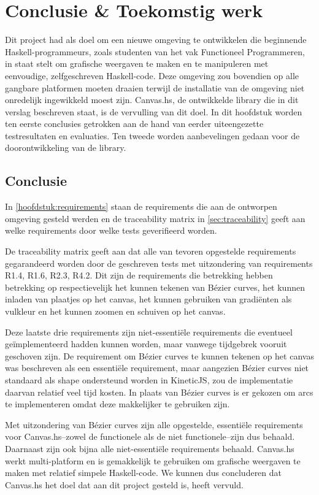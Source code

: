 \chapter{Conclusie \& Toekomstig werk} \label{hoofdstuk:conclusie}
Dit project had als doel om een nieuwe omgeving te ontwikkelen die beginnende Haskell-programmeurs, zoals studenten van het vak Functioneel Programmeren, in staat stelt om grafische weergaven te maken en te manipuleren met eenvoudige, zelfgeschreven Haskell-code. Deze omgeving zou bovendien op alle gangbare platformen moeten draaien terwijl de installatie van de omgeving niet onredelijk ingewikkeld moest zijn. Canvas.hs, de ontwikkelde library die in dit verslag beschreven staat, is de vervulling van dit doel. In dit hoofdstuk worden ten eerste conclusies getrokken aan de hand van eerder uiteengezette testresultaten en evaluaties. Ten tweede worden aanbevelingen gedaan voor de doorontwikkeling van de library.

\section{Conclusie} \label{sec:conclusie}
In \autoref{hoofdstuk:requirements} staan de requirements die aan de ontworpen omgeving gesteld werden en de traceability matrix in \autoref{sec:traceability} geeft aan welke requirements door welke tests geverifieerd worden.

De traceability matrix geeft aan dat alle van tevoren opgestelde requirements gegarandeerd worden door de geschreven tests met uitzondering van requirements R1.4, R1.6, R2.3, R4.2. Dit zijn de requirements die betrekking hebben betrekking op respectievelijk het kunnen tekenen van Bézier curves, het kunnen inladen van plaatjes op het canvas, het kunnen gebruiken van gradiënten als vulkleur en het kunnen zoomen en schuiven op het canvas.

Deze laatste drie requirements zijn niet-essentiële requirements die eventueel ge\"implementeerd hadden kunnen worden, maar vanwege tijdgebrek vooruit geschoven zijn. De requirement om Bézier curves te kunnen tekenen op het canvas was beschreven als een essentiële requirement, maar aangezien Bézier curves niet standaard als shape ondersteund worden in KineticJS, zou de implementatie daarvan relatief veel tijd kosten. In plaats van Bézier curves is er gekozen om arcs te implementeren omdat deze makkelijker te gebruiken zijn.

Met uitzondering van Bézier curves zijn alle opgestelde, essentiële requirements voor Canvas.hs--zowel de functionele als de niet functionele--zijn dus behaald. Daarnaast zijn ook bijna alle niet-essentiële requirements behaald. Canvas.hs werkt multi-platform en is gemakkelijk te gebruiken om grafische weergaven te maken met relatief simpele Haskell-code. We kunnen dus concluderen dat Canvas.hs het doel dat aan dit project gesteld is, heeft vervuld.

